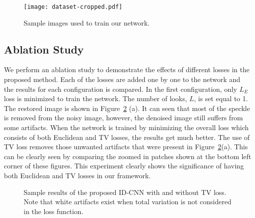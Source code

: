\documentclass[journal]{IEEEtran}
\begin{document}
\begin{figure}[htp!]
 \centering
 \texttt{[image: dataset-cropped.pdf]}
 \caption{Sample images used to train our network.}
\label{fig:dataset}
\end{figure}


\subsection{Ablation Study} 
We perform an ablation study to demonstrate the effects of different losses in the proposed method. Each of the losses are added one by one to the network and the results for each configuration is compared.  In the first configuration, only $L_E$ loss is minimized to train the network.  The number of looks, $L$, is set equal to 1.  The restored image is shown in Figure~\ref{fig:TV} (a).  It can seen that most of the speckle is removed from the noisy image, however, the denoised image still suffers from some artifacts.  When the network is trained by minimizing the overall loss which consists of both Euclidean and TV losses, the results get much better.  The use of TV loss removes those unwanted artifacts that were present in Figure~\ref{fig:TV}(a).   This can be clearly seen by comparing the zoomed in patches shown at the bottom left corner of these figures.  This experiment clearly shows the significance of having both Euclidean and TV losses in our framework. 

\begin{figure}[htp!]
	\centering
	\label{1a}\hspace{1em}
	\label{1b}
	\caption{Sample results of the proposed ID-CNN with and without TV loss. Note that white artifacts exist when total variation is not considered in the loss function.}
	\label{fig:TV} 
\end{figure}
\end{document}

